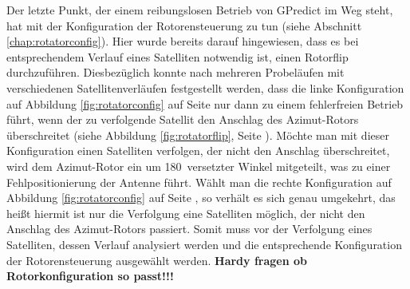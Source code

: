 Der letzte Punkt, der einem reibungslosen Betrieb von GPredict im Weg steht, hat mit der Konfiguration der Rotorensteuerung zu tun (siehe Abschnitt \ref{chap:rotatorconfig}).\label{rotatorflip2} Hier wurde bereits darauf hingewiesen, dass es bei  entsprechendem Verlauf eines Satelliten notwendig ist, einen Rotorflip durchzuführen. Diesbezüglich konnte nach mehreren Probeläufen mit verschiedenen Satellitenverläufen festgestellt werden, dass die linke Konfiguration auf Abbildung \ref{fig:rotatorconfig} auf Seite \pageref{fig:rotatorconfig} nur dann zu einem fehlerfreien Betrieb führt, wenn der zu verfolgende Satellit den Anschlag des Azimut-Rotors überschreitet (siehe Abbildung \ref{fig:rotatorflip}, Seite \pageref{fig:rotatorflip}). Möchte man mit dieser Konfiguration einen Satelliten verfolgen, der nicht den Anschlag überschreitet, wird dem Azimut-Rotor ein um 180\mydegree\ versetzter Winkel mitgeteilt, was zu einer Fehlpositionierung der Antenne führt. Wählt man die rechte Konfiguration auf Abbildung \ref{fig:rotatorconfig} auf Seite \pageref{fig:rotatorconfig}, so verhält es sich genau umgekehrt, das heißt hiermit ist nur die Verfolgung eine Satelliten möglich, der nicht den Anschlag des Azimut-Rotors passiert. Somit muss vor der Verfolgung eines Satelliten, dessen Verlauf analysiert werden und die entsprechende Konfiguration der Rotorensteuerung ausgewählt werden.\newpar
\textbf{Hardy fragen ob Rotorkonfiguration so passt!!!}\newpar